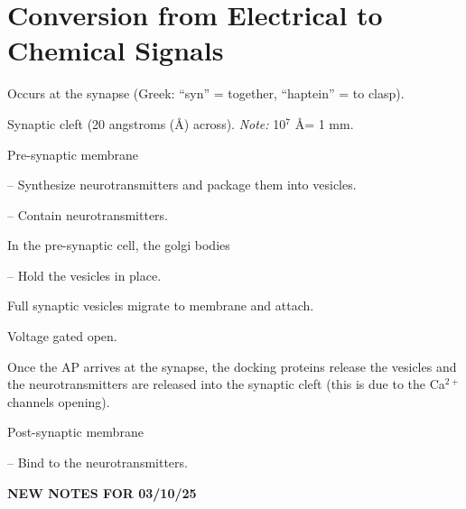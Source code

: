 \section{Conversion from Electrical to Chemical Signals}

\begin{coloredlist}
    \item Occurs at the synapse (Greek: ``syn'' = together, ``haptein'' = to clasp).
    \begin{coloredlist}
        \item Synaptic cleft (20 angstroms (\AA) across). \textit{Note:} 10\(^7\) \AA = 1 mm.
        \item Pre-synaptic membrane
        \begin{coloredlist}
            \item {} -- Synthesize neurotransmitters and package them into vesicles.
            \item {} -- Contain neurotransmitters.
            \begin{coloredlist}
                \item In the pre-synaptic cell, the golgi bodies 
            \end{coloredlist}
            \item {} -- Hold the vesicles in place.
            \begin{coloredlist}
                \item Full synaptic vesicles migrate to membrane and attach.
            \end{coloredlist}
            \item Voltage gated  open.
            \item Once the AP arrives at the synapse, the docking proteins release the vesicles and the neurotransmitters are released into the synaptic cleft (this is due to the Ca\(^{2+}\) channels opening).
        \end{coloredlist}
        \item Post-synaptic membrane
        \begin{coloredlist}
            \item {} -- Bind to the neurotransmitters.
        \end{coloredlist}
    \end{coloredlist}
\end{coloredlist}
\newpage
\begin{center}
    \textbf{NEW NOTES FOR 03/10/25} \\
    \hrulefill
\end{center}

